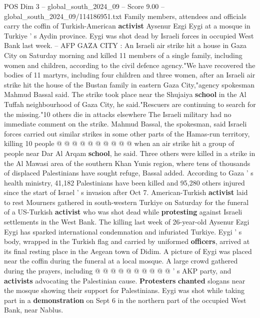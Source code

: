 \begin{textsample}{POS Dim 3 – global\_south\_2024\_09 – Score 9.00 – global\_south\_2024\_09/114186951.txt}  \label{ex:f3_pos_321}
Family members, attendees and officials carry the coffin of Turkish-American \textbf{activist} Aysenur Ezgi Eygi at a mosque in Turkiye ' s Aydin province.
Eygi was shot dead by Israeli forces in occupied West Bank last week. -- AFP GAZA CITY : An Israeli air strike hit a house in Gaza City on Saturday morning and killed 11 members of a single family, including women and children, according to the civil defence agency."We have recovered the bodies of 11 martyrs, including four children and three women, after an Israeli air strike hit the house of the Bustan family in eastern Gaza City,"agency spokesman Mahmud Bassal said.
The strike took place near the Shujaiya \textbf{school} in the Al Tuffah neighbourhood of Gaza City, he said."Rescuers are continuing to search for the missing."10 others die in attacks elsewhere The Israeli military had no immediate comment on the strike.
Mahmud Bassal, the spokesman, said Israeli forces carried out similar strikes in some other parts of the Hamas-run territory, killing 10 people @ @ @ @ @ @ @ @ @ @ when an air strike hit a group of people near Dar Al Arqam \textbf{school}, he said.
Three others were killed in a strike in the Al Mawasi area of the southern Khan Yunis region, where tens of thousands of displaced Palestinians have sought refuge, Bassal added.
According to Gaza ' s health ministry, 41,182 Palestinians have been killed and 95,280 others injured since the start of Israel ' s invasion after Oct 7.
American-Turkish \textbf{activist} laid to rest Mourners gathered in south-western Turkiye on Saturday for the funeral of a US-Turkish \textbf{activist} who was shot dead while \textbf{protesting} against Israeli settlements in the West Bank.
The killing last week of 26-year-old Aysenur Ezgi Eygi has sparked international condemnation and infuriated Turkiye.
Eygi ' s body, wrapped in the Turkish flag and carried by uniformed \textbf{officers}, arrived at its final resting place in the Aegean town of Didim.
A picture of Eygi was placed near the coffin during the funeral at a local mosque.
A large crowd gathered during the prayers, including @ @ @ @ @ @ @ @ @ @ ' s AKP party, and \textbf{activists} advocating the Palestinian cause. \textbf{Protesters} \textbf{chanted} slogans near the mosque showing their support for Palestinians.
Eygi was shot while taking part in a \textbf{demonstration} on Sept 6 in the northern part of the occupied West Bank, near Nablus.

\end{textsample}
